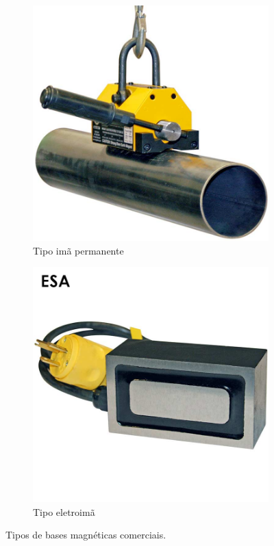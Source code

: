 \begin{figure}[h!]
\begin{subfigure}[b]{0.5\columnwidth}
  \centering
  \includegraphics[width=.9\columnwidth]{sota/figs/base/mangnetpipe}
  \caption{Tipo imã permanente}
  \label{fig:sfig1}
\end{subfigure}%
\begin{subfigure}[b]{0.4\columnwidth}
  \centering
  \includegraphics[width=.9\columnwidth]{sota/figs/base/eletromagnet}
  \caption{Tipo eletroimã}
  \label{fig:sfig2}
\end{subfigure}
\caption{Tipos de bases magnéticas comerciais.}
\label{fig::base::imas}
\end{figure}

